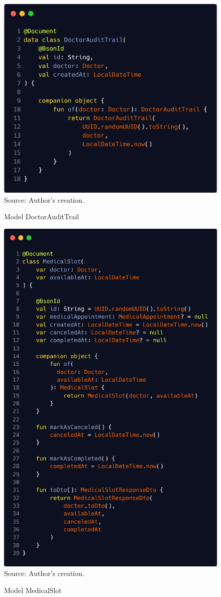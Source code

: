 \begin{figure}[H]
	\centering
	\caption{Model DoctorAuditTrail}
	\includegraphics[width=1\linewidth]{figures/doctor_audit_trail}
	\label{fig:doctoraudittrail}
	\footnotesize Source: Author's creation.
\end{figure}

\begin{figure}[H]
	\centering
	\caption{Model MedicalSlot}
	\includegraphics[width=0.85\linewidth]{figures/medical_slot}
	\label{fig:medicalslot}
	\\ \footnotesize Source: Author's creation.
\end{figure}

